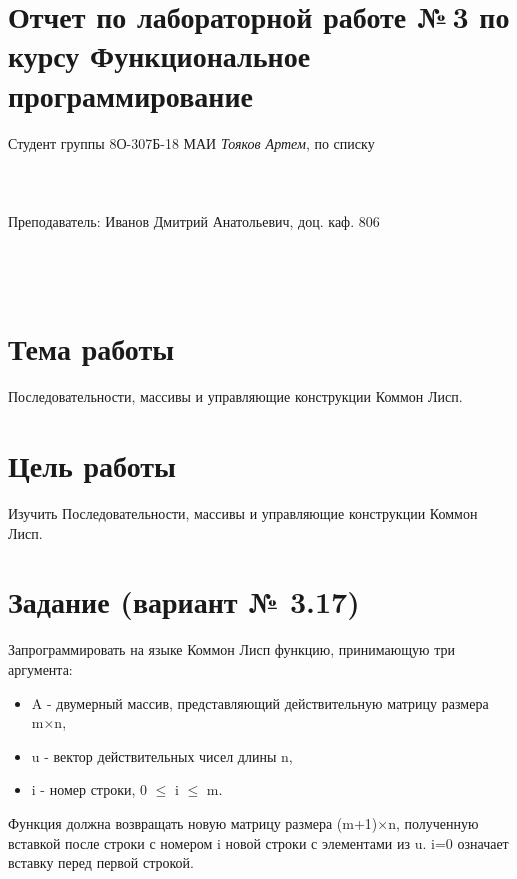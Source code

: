 \documentclass[12pt]{article}
\begin{document}
\section*{Отчет по лабораторной работе №\,3 
по курсу \guillemotleft  Функциональное программирование\guillemotright}
\begin{flushright}
Студент группы 8О-307Б-18 МАИ \textit{Тояков Артем},  по списку \\
 \\
 \\
\ \\
Преподаватель: Иванов Дмитрий Анатольевич, доц. каф. 806 \\
 \\
 \\
 \\

\end{flushright}

\section{Тема работы}
Последовательности, массивы и управляющие конструкции Коммон Лисп.

\section{Цель работы}
Изучить Последовательности, массивы и управляющие конструкции Коммон Лисп.

\section{Задание (вариант № 3.17)}
Запрограммировать на языке Коммон Лисп функцию, принимающую три аргумента:
\begin{itemize}
    \item A - двумерный массив, представляющий действительную матрицу размера m×n,
    \item u - вектор действительных чисел длины n,
    \item i - номер строки, 0 $\leqslant$ i $\leqslant$ m.
\end{itemize}
    
Функция должна возвращать новую матрицу размера (m+1)×n, полученную вставкой после строки с номером i новой строки с элементами из u. i=0 означает вставку перед первой строкой.
\end{document}
